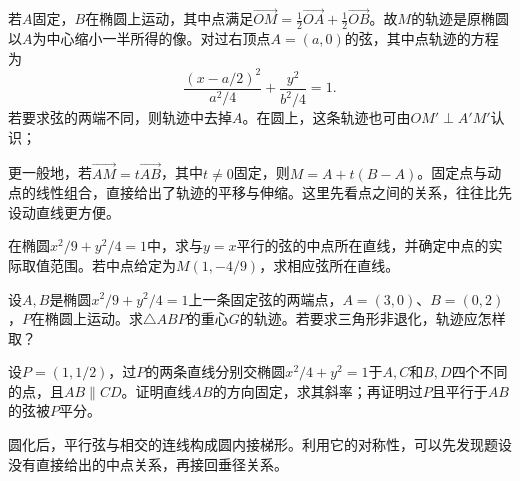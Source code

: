 若\(A\)固定，\(B\)在椭圆上运动，其中点满足\(\overrightarrow{OM}=\frac12\overrightarrow{OA}+\frac12\overrightarrow{OB}\)。故\(M\)的轨迹是原椭圆以\(A\)为中心缩小一半所得的像。对过右顶点\(A=(a,0)\)的弦，其中点轨迹的方程为
\begin{equation}\label{eq:quadratic-vertex-chord-midpoints}
    \frac{(x-a/2)^2}{a^2/4}+\frac{y^2}{b^2/4}=1 .
\end{equation}
若要求弦的两端不同，则轨迹中去掉\(A\)。在圆上，这条轨迹也可由\(OM'\perp A'M'\)认识；

更一般地，若\(\overrightarrow{AM}=t\overrightarrow{AB}\)，其中\(t\ne0\)固定，则\(M=A+t(B-A)\)。固定点与动点的线性组合，直接给出了轨迹的平移与伸缩。这里先看点之间的关系，往往比先设动直线更方便。

\begin{samepage}
\begin{example}
在椭圆\(x^2/9+y^2/4=1\)中，求与\(y=x\)平行的弦的中点所在直线，并确定中点的实际取值范围。若中点给定为\(M(1,-4/9)\)，求相应弦所在直线。
\end{example}
\end{samepage}

\begin{samepage}
\begin{example}
设\(A,B\)是椭圆\(x^2/9+y^2/4=1\)上一条固定弦的两端点，\(A=(3,0)\)、\(B=(0,2)\)，\(P\)在椭圆上运动。求\(\triangle ABP\)的重心\(G\)的轨迹。若要求三角形非退化，轨迹应怎样取？
\end{example}
\end{samepage}

\begin{samepage}
\begin{example}\label{ex:quadratic-affine-hidden-midpoint}
设\(P=(1,1/2)\)，过\(P\)的两条直线分别交椭圆\(x^2/4+y^2=1\)于\(A,C\)和\(B,D\)四个不同的点，且\(AB\parallel CD\)。证明直线\(AB\)的方向固定，求其斜率；再证明过\(P\)且平行于\(AB\)的弦被\(P\)平分。
\end{example}
\end{samepage}

圆化后，平行弦与相交的连线构成圆内接梯形。利用它的对称性，可以先发现题设没有直接给出的中点关系，再接回垂径关系。

